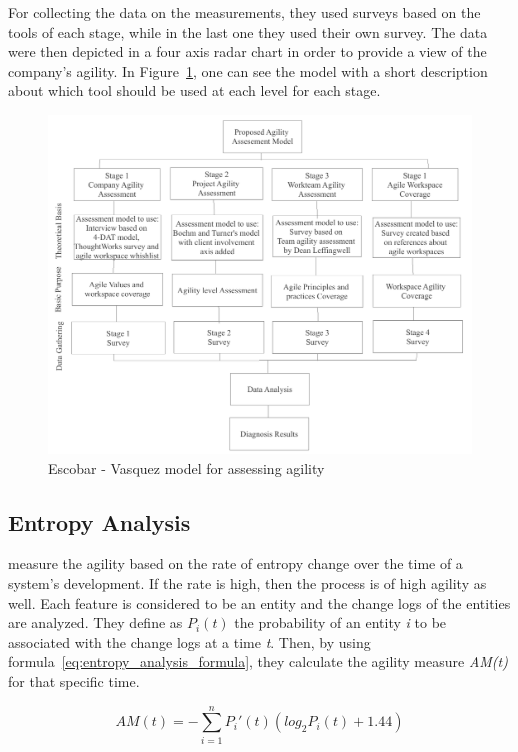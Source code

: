 For collecting the data on the measurements, they used surveys based on the tools of each stage, while in the last one they used their own survey. The data were then depicted in a four axis radar chart in order to provide a view of the company's agility. In Figure~\ref{escobar_model}, one can see the model with a short description about which tool should be used at each level for each stage.

\begin{figure} [H]
\centerline{\includegraphics[scale=0.75]{include/relatedwork/fig/escobar_model.pdf}}
\caption{Escobar - Vasquez model for assessing agility} 
\label{escobar_model}
\end{figure}

\subsection{Entropy Analysis}
\citet{entropy} measure the agility based on the rate of entropy change over the time of a system's development. If the rate is high, then the process is of high agility as well. Each feature is considered to be an entity and the change logs of the entities are analyzed. They define as $P_i(t)$  the probability of an entity \textit{i} to be associated with the change logs at a time \textit{t}. Then, by using formula~\eqref{eq:entropy_analysis_formula}, they calculate the agility measure \textit{AM(t)} for that specific time.

\begin{equation} \label{eq:entropy_analysis_formula} AM(t) = - \sum_{i=1}^{n} P_i'(t) (log_2 P_i(t) + 1.44) \end{equation} 

